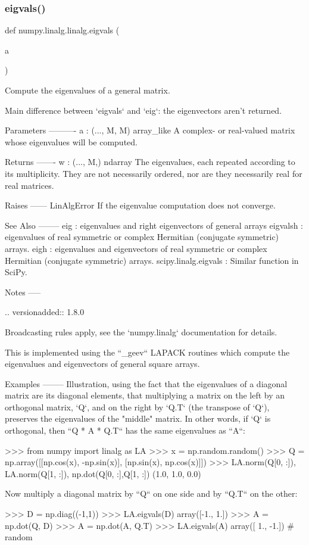 \subsubsection{\texorpdfstring{eigvals()}{eigvals()}}
{\footnotesize\ttfamily def numpy.\+linalg.\+linalg.\+eigvals (\begin{DoxyParamCaption}\item[{}]{a }\end{DoxyParamCaption})}

\begin{DoxyVerb}Compute the eigenvalues of a general matrix.

Main difference between `eigvals` and `eig`: the eigenvectors aren't
returned.

Parameters
----------
a : (..., M, M) array_like
    A complex- or real-valued matrix whose eigenvalues will be computed.

Returns
-------
w : (..., M,) ndarray
    The eigenvalues, each repeated according to its multiplicity.
    They are not necessarily ordered, nor are they necessarily
    real for real matrices.

Raises
------
LinAlgError
    If the eigenvalue computation does not converge.

See Also
--------
eig : eigenvalues and right eigenvectors of general arrays
eigvalsh : eigenvalues of real symmetric or complex Hermitian
           (conjugate symmetric) arrays.
eigh : eigenvalues and eigenvectors of real symmetric or complex
       Hermitian (conjugate symmetric) arrays.
scipy.linalg.eigvals : Similar function in SciPy.

Notes
-----

.. versionadded:: 1.8.0

Broadcasting rules apply, see the `numpy.linalg` documentation for
details.

This is implemented using the ``_geev`` LAPACK routines which compute
the eigenvalues and eigenvectors of general square arrays.

Examples
--------
Illustration, using the fact that the eigenvalues of a diagonal matrix
are its diagonal elements, that multiplying a matrix on the left
by an orthogonal matrix, `Q`, and on the right by `Q.T` (the transpose
of `Q`), preserves the eigenvalues of the "middle" matrix.  In other words,
if `Q` is orthogonal, then ``Q * A * Q.T`` has the same eigenvalues as
``A``:

>>> from numpy import linalg as LA
>>> x = np.random.random()
>>> Q = np.array([[np.cos(x), -np.sin(x)], [np.sin(x), np.cos(x)]])
>>> LA.norm(Q[0, :]), LA.norm(Q[1, :]), np.dot(Q[0, :],Q[1, :])
(1.0, 1.0, 0.0)

Now multiply a diagonal matrix by ``Q`` on one side and by ``Q.T`` on the other:

>>> D = np.diag((-1,1))
>>> LA.eigvals(D)
array([-1.,  1.])
>>> A = np.dot(Q, D)
>>> A = np.dot(A, Q.T)
>>> LA.eigvals(A)
array([ 1., -1.]) # random\end{DoxyVerb}
 \mbox{\label{namespacenumpy_1_1linalg_1_1linalg_a04883f826ece6eca658d4d3c9e7db337}} 
